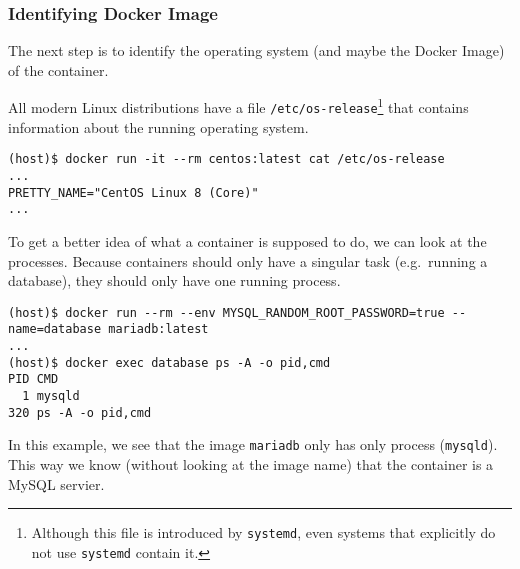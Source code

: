 \subsubsection{Identifying Docker Image}

The next step is to identify the operating system (and maybe the Docker Image) of the container.

All modern Linux distributions have a file \lstinline{/etc/os-release}\footnote{Although this file is introduced by \lstinline{systemd}, even systems that explicitly do not use \lstinline{systemd} contain it.} that contains information about the running operating system.
\begin{lstlisting}[caption={CentOS container \lstinline{/etc/os-release}},captionpos=b]
(host)$ docker run -it --rm centos:latest cat /etc/os-release
...
PRETTY_NAME="CentOS Linux 8 (Core)"
...
\end{lstlisting}

\hfill

To get a better idea of what a container is supposed to do, we can look at the processes. Because containers should only have a singular task (e.g.\ running a database), they should only have one running process. 

\begin{lstlisting}[caption={A container only has one process},captionpos=b]
(host)$ docker run --rm --env MYSQL_RANDOM_ROOT_PASSWORD=true --name=database mariadb:latest
...
(host)$ docker exec database ps -A -o pid,cmd
PID CMD
  1 mysqld
320 ps -A -o pid,cmd
\end{lstlisting}

In this example, we see that the image \lstinline{mariadb} only has only process (\lstinline{mysqld}). This way we know (without looking at the image name) that the container is a MySQL servier.
